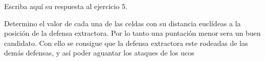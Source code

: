 Escriba aquí su respuesta al ejercicio 5.

Determino el valor de cada una de las celdas con su distancia euclídeas a la posición de la defensa extractora. Por lo tanto una puntación menor sera un buen candidato.
Con ello se consigue que la defensa extractora este rodeadas de las demás defensas, y así poder aguantar los ataques de los ucos


